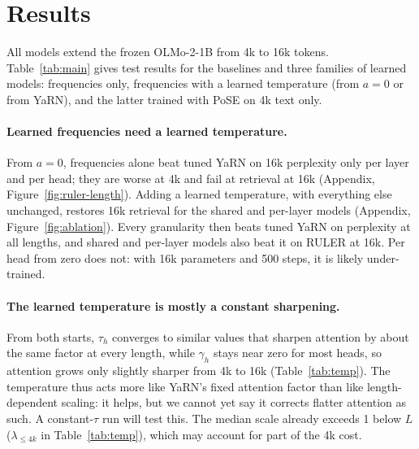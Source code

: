 
\graphicspath{{figures/}}

\section{Results}
\label{sec:results}

All models extend the frozen OLMo-2-1B from 4k to 16k tokens. Table~\ref{tab:main} gives test results for the baselines and three families of learned models: frequencies only, frequencies with a learned temperature (from $a = 0$ or from YaRN), and the latter trained with PoSE on 4k text only.

\paragraph{Learned frequencies need a learned temperature.}
From $a = 0$, frequencies alone beat tuned YaRN on 16k perplexity only per layer and per head; they are worse at 4k and fail at retrieval at 16k (Appendix, Figure~\ref{fig:ruler-length}). Adding a learned temperature, with everything else unchanged, restores 16k retrieval for the shared and per-layer models (Appendix, Figure~\ref{fig:ablation}). Every granularity then beats tuned YaRN on perplexity at all lengths, and shared and per-layer models also beat it on RULER at 16k. Per head from zero does not: with 16k parameters and 500 steps, it is likely under-trained.
\paragraph{The learned temperature is mostly a constant sharpening.}
From both starts, $\tau_h$ converges to similar values that sharpen attention by about the same factor at every length, while $\gamma_h$ stays near zero for most heads, so attention grows only slightly sharper from 4k to 16k (Table~\ref{tab:temp}). The temperature thus acts more like YaRN's fixed attention factor than like length-dependent scaling: it helps, but we cannot yet say it corrects flatter attention as such. A constant-$\tau$ run will test this. The median scale already exceeds 1 below $L$ ($\lambda_{\le 4k}$ in Table~\ref{tab:temp}), which may account for part of the 4k cost.

